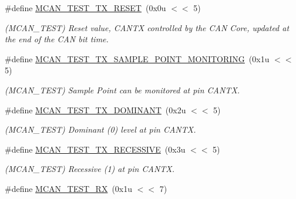 \begin{DoxyCompactItemize}
\#define \mbox{\hyperlink{group__SAME70__MCAN_ga83ede71429fcf85f18c460916b63852a}{M\+C\+A\+N\+\_\+\+T\+E\+S\+T\+\_\+\+T\+X\+\_\+\+R\+E\+S\+ET}}~(0x0u $<$$<$ 5)
\begin{DoxyCompactList}\small\item\em (M\+C\+A\+N\+\_\+\+T\+E\+ST) Reset value, C\+A\+N\+TX controlled by the C\+AN Core, updated at the end of the C\+AN bit time. \end{DoxyCompactList}\item 
\mbox{\label{group__SAME70__MCAN_ga3098b4b52424239f73d302369a7df393}} 
\#define \mbox{\hyperlink{group__SAME70__MCAN_ga3098b4b52424239f73d302369a7df393}{M\+C\+A\+N\+\_\+\+T\+E\+S\+T\+\_\+\+T\+X\+\_\+\+S\+A\+M\+P\+L\+E\+\_\+\+P\+O\+I\+N\+T\+\_\+\+M\+O\+N\+I\+T\+O\+R\+I\+NG}}~(0x1u $<$$<$ 5)
\begin{DoxyCompactList}\small\item\em (M\+C\+A\+N\+\_\+\+T\+E\+ST) Sample Point can be monitored at pin C\+A\+N\+TX. \end{DoxyCompactList}\item 
\mbox{\label{group__SAME70__MCAN_ga1f0c1d8ba3ed5c83d4460f184efffae5}} 
\#define \mbox{\hyperlink{group__SAME70__MCAN_ga1f0c1d8ba3ed5c83d4460f184efffae5}{M\+C\+A\+N\+\_\+\+T\+E\+S\+T\+\_\+\+T\+X\+\_\+\+D\+O\+M\+I\+N\+A\+NT}}~(0x2u $<$$<$ 5)
\begin{DoxyCompactList}\small\item\em (M\+C\+A\+N\+\_\+\+T\+E\+ST) Dominant (\textquotesingle{}0\textquotesingle{}) level at pin C\+A\+N\+TX. \end{DoxyCompactList}\item 
\mbox{\label{group__SAME70__MCAN_ga767740aee34ad9b9ab44748b8a35f1bc}} 
\#define \mbox{\hyperlink{group__SAME70__MCAN_ga767740aee34ad9b9ab44748b8a35f1bc}{M\+C\+A\+N\+\_\+\+T\+E\+S\+T\+\_\+\+T\+X\+\_\+\+R\+E\+C\+E\+S\+S\+I\+VE}}~(0x3u $<$$<$ 5)
\begin{DoxyCompactList}\small\item\em (M\+C\+A\+N\+\_\+\+T\+E\+ST) Recessive (\textquotesingle{}1\textquotesingle{}) at pin C\+A\+N\+TX. \end{DoxyCompactList}\item 
\mbox{\label{group__SAME70__MCAN_ga392a451f0deb62981e36c302aa0a0a49}} 
\#define \mbox{\hyperlink{group__SAME70__MCAN_ga392a451f0deb62981e36c302aa0a0a49}{M\+C\+A\+N\+\_\+\+T\+E\+S\+T\+\_\+\+RX}}~(0x1u $<$$<$ 7)
$$
\end{DoxyCompactItemize}
